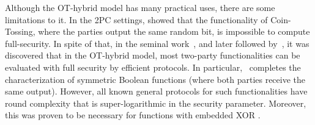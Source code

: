 \documentclass{llncs}
\begin{document}
 Although the OT-hybrid model has many practical uses, there are some limitations to it. In the 2PC settings, \citet{Cleve86} showed that the functionality of Coin-Tossing, where the parties output the same random bit, is impossible to compute full-security. In spite of that, in the seminal work~\citet{GHKL08}, and later followed by~\cite{Ash14,makriyannis2014classification,daza2017designingfull,asharov2015complete}, it was discovered that in the OT-hybrid model, most two-party functionalities can be evaluated with full security by efficient protocols. In particular,~\cite{asharov2015complete} completes the characterization of symmetric Boolean functions (where both parties receive the same output). However, all known general protocols for such functionalities have round complexity that is super-logarithmic in the security parameter. Moreover, this was proven to be necessary for functions with embedded XOR \cite{GHKL08}.
 
\end{document}
